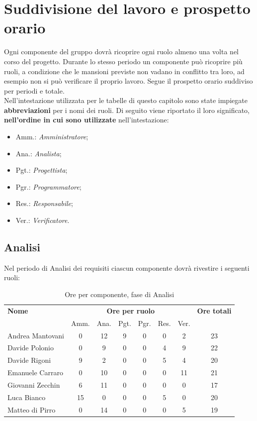 \section{Suddivisione del lavoro e prospetto orario}
Ogni componente del gruppo dovrà ricoprire ogni ruolo almeno una volta nel corso del progetto.
Durante lo stesso periodo un componente può ricoprire più ruoli, a condizione che le mansioni previste non vadano in conflitto tra loro, ad esempio non si può verificare il proprio lavoro.
Segue il prospetto orario suddiviso per periodi e totale. \\

Nell'intestazione utilizzata per le tabelle di questo capitolo sono state impiegate \textbf{abbreviazioni} per i nomi dei ruoli.
Di seguito viene riportato il loro significato, \textbf{nell'ordine in cui sono utilizzate} nell'intestazione:
\begin{itemize}
\item Amm.: \textit{Amministratore};
\item Ana.: \textit{Analista};
\item Pgt.: \textit{Progettista};
\item Pgr.: \textit{Programmatore};
\item Res.: \textit{Responsabile};
\item Ver.: \textit{Verificatore}.
\end{itemize}

\pagebreak
\subsection{Analisi}
Nel periodo di Analisi dei requisiti ciascun componente dovrà rivestire i seguenti ruoli:

\begin{table}[H]
\begin{tabular}{lccccccc}
\toprule
    \textbf{Nome}  & \multicolumn{6}{c}{\textbf{Ore per ruolo}} & \textbf{Ore totali} \\
     & Amm. & Ana. & Pgt. & Pgr. & Res. & Ver. & \\
    \midrule
    
	Andrea Mantovani & 0 & 12 & 9 & 0 & 0 & 2 & 23 \\
	Davide Polonio & 0 & 9 & 0 & 0 & 4 & 9 & 22 \\
	Davide Rigoni & 9 & 2 & 0 & 0 & 5 & 4 & 20 \\
	Emanuele Carraro & 0 & 10 & 0 & 0 & 0 & 11 & 21 \\
	Giovanni Zecchin & 6 & 11 & 0 & 0 & 0 & 0 & 17 \\
	Luca Bianco & 15 & 0 & 0 & 0 & 5 & 0 & 20 \\
	Matteo di Pirro & 0 & 14 & 0 & 0 & 0 & 5 & 19 \\
    
    \bottomrule
\end{tabular}
\caption{Ore per componente, fase di Analisi}
\end{table}

